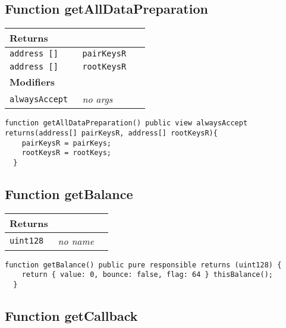\subsection{Function getAllDataPreparation}


\ifsoltables
\noindent\begin{tabular}{|l|l|p{5cm}|}\hline
\multicolumn{3}{|l|}{\bf Returns}\\\hline
\tt address [] & \tt pairKeysR &\\\hline
\tt address [] & \tt rootKeysR &\\\hline
\multicolumn{3}{|l|}{\bf Modifiers}\\\hline
\tt alwaysAccept & {\em no args} &\\\hline
\end{tabular}
\fi

\vspace{2cm}

\begin{lstlisting}[firstnumber=215]
  function getAllDataPreparation() public view alwaysAccept returns(address[] pairKeysR, address[] rootKeysR){
    pairKeysR = pairKeys;
    rootKeysR = rootKeys;
  }
\end{lstlisting}

\subsection{Function getBalance}


\ifsoltables
\noindent\begin{tabular}{|l|l|p{5cm}|}\hline
\multicolumn{3}{|l|}{\bf Returns}\\\hline
\tt uint128 & {\em no name} &\\\hline
\end{tabular}
\fi

\vspace{2cm}

\begin{lstlisting}[firstnumber=351]
  function getBalance() public pure responsible returns (uint128) {
    return { value: 0, bounce: false, flag: 64 } thisBalance();
  }
\end{lstlisting}

\subsection{Function getCallback}


